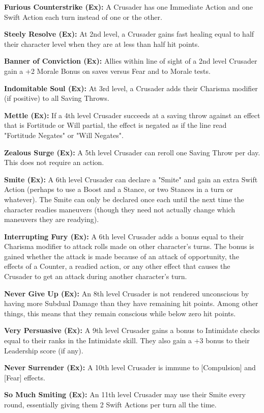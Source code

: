 \textbf{Furious Counterstrike (Ex):} A Crusader has one Immediate Action and one Swift Action each turn instead of one or the other.

\textbf{Steely Resolve (Ex):} At 2nd level, a Crusader gains fast healing equal to half their character level when they are at less than half hit points.

\textbf{Banner of Conviction (Ex):} Allies within line of sight of a 2nd level Crusader gain a +2 Morale Bonus on saves versus Fear and to Morale tests.

\textbf{Indomitable Soul (Ex):} At 3rd level, a Crusader adds their Charisma modifier (if positive) to all Saving Throws.

\textbf{Mettle (Ex):} If a 4th level Crusader succeeds at a saving throw against an effect that is Fortitude or Will partial, the effect is negated as if the line read "Fortitude Negates" or "Will Negates".

\textbf{Zealous Surge (Ex):} A 5th level Crusader can reroll one Saving Throw per day. This does not require an action.

\textbf{Smite (Ex):} A 6th level Crusader can declare a "Smite" and gain an extra Swift Action (perhaps to use a Boost and a Stance, or two Stances in a turn or whatever). The Smite can only be declared once each until the next time the character readies maneuvers (though they need not actually change which maneuvers they are readying).

\textbf{Interrupting Fury (Ex):} A 6th level Crusader adds a bonus equal to their Charisma modifier to attack rolls made on other character's turns. The bonus is gained whether the attack is made because of an attack of opportunity, the effects of a Counter, a readied action, or any other effect that causes the Crusader to get an attack during another character's turn.

\textbf{Never Give Up (Ex):} An 8th level Crusader is not rendered unconscious by having more Subdual Damage than they have remaining hit points. Among other things, this means that they remain conscious while below zero hit points.

\textbf{Very Persuasive (Ex):} A 9th level Crusader gains a bonus to Intimidate checks equal to their ranks in the Intimidate skill. They also gain a +3 bonus to their Leadership score (if any).

\textbf{Never Surrender (Ex):} A 10th level Crusader is immune to [Compulsion] and [Fear] effects.

\textbf{So Much Smiting (Ex):} An 11th level Crusader may use their Smite every round, essentially giving them 2 Swift Actions per turn all the time.

